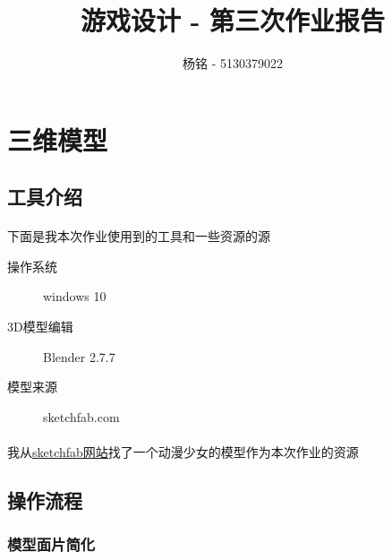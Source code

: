 \documentclass{article}
\author{杨铭 - 5130379022}
\title{游戏设计 - 第三次作业报告}
\begin{document}
\maketitle
\tableofcontents
\section{三维模型}
\subsection{工具介绍}
\paragraph{}
下面是我本次作业使用到的工具和一些资源的源
\begin{description}
  \item[操作系统] windows 10
  \item[3D模型编辑] Blender 2.7.7
  \item[模型来源] sketchfab.com
\end{description}
\paragraph{}
我从\href{https://sketchfab.com/models/5f7371056ba148e0a7936014a9b05030}{sketchfab网站}找了一个动漫少女的模型作为本次作业的资源
\subsection{操作流程}
\subsubsection{模型面片简化}
\end{document}
